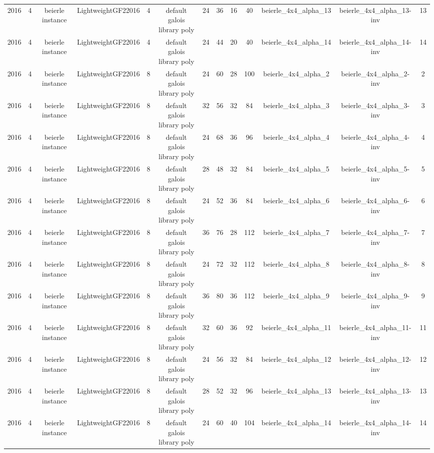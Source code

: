 \begin{tabular}{c c c c c c c c c c c c c}
2016 & 4 & beierle instance & LightweightGF22016 & 4 & default galois library poly & 24 & 36 & 16 & 40 & beierle_4x4_alpha_13 & beierle_4x4_alpha_13-inv & 13 \\
2016 & 4 & beierle instance & LightweightGF22016 & 4 & default galois library poly & 24 & 44 & 20 & 40 & beierle_4x4_alpha_14 & beierle_4x4_alpha_14-inv & 14 \\
2016 & 4 & beierle instance & LightweightGF22016 & 8 & default galois library poly & 24 & 60 & 28 & 100 & beierle_4x4_alpha_2 & beierle_4x4_alpha_2-inv & 2 \\
2016 & 4 & beierle instance & LightweightGF22016 & 8 & default galois library poly & 32 & 56 & 32 & 84 & beierle_4x4_alpha_3 & beierle_4x4_alpha_3-inv & 3 \\
2016 & 4 & beierle instance & LightweightGF22016 & 8 & default galois library poly & 24 & 68 & 36 & 96 & beierle_4x4_alpha_4 & beierle_4x4_alpha_4-inv & 4 \\
2016 & 4 & beierle instance & LightweightGF22016 & 8 & default galois library poly & 28 & 48 & 32 & 84 & beierle_4x4_alpha_5 & beierle_4x4_alpha_5-inv & 5 \\
2016 & 4 & beierle instance & LightweightGF22016 & 8 & default galois library poly & 24 & 52 & 36 & 84 & beierle_4x4_alpha_6 & beierle_4x4_alpha_6-inv & 6 \\
2016 & 4 & beierle instance & LightweightGF22016 & 8 & default galois library poly & 36 & 76 & 28 & 112 & beierle_4x4_alpha_7 & beierle_4x4_alpha_7-inv & 7 \\
2016 & 4 & beierle instance & LightweightGF22016 & 8 & default galois library poly & 24 & 72 & 32 & 112 & beierle_4x4_alpha_8 & beierle_4x4_alpha_8-inv & 8 \\
2016 & 4 & beierle instance & LightweightGF22016 & 8 & default galois library poly & 36 & 80 & 36 & 112 & beierle_4x4_alpha_9 & beierle_4x4_alpha_9-inv & 9 \\
2016 & 4 & beierle instance & LightweightGF22016 & 8 & default galois library poly & 32 & 60 & 36 & 92 & beierle_4x4_alpha_11 & beierle_4x4_alpha_11-inv & 11 \\
2016 & 4 & beierle instance & LightweightGF22016 & 8 & default galois library poly & 24 & 56 & 32 & 84 & beierle_4x4_alpha_12 & beierle_4x4_alpha_12-inv & 12 \\
2016 & 4 & beierle instance & LightweightGF22016 & 8 & default galois library poly & 28 & 52 & 32 & 96 & beierle_4x4_alpha_13 & beierle_4x4_alpha_13-inv & 13 \\
2016 & 4 & beierle instance & LightweightGF22016 & 8 & default galois library poly & 24 & 60 & 40 & 104 & beierle_4x4_alpha_14 & beierle_4x4_alpha_14-inv & 14 \\

\end{tabular}
